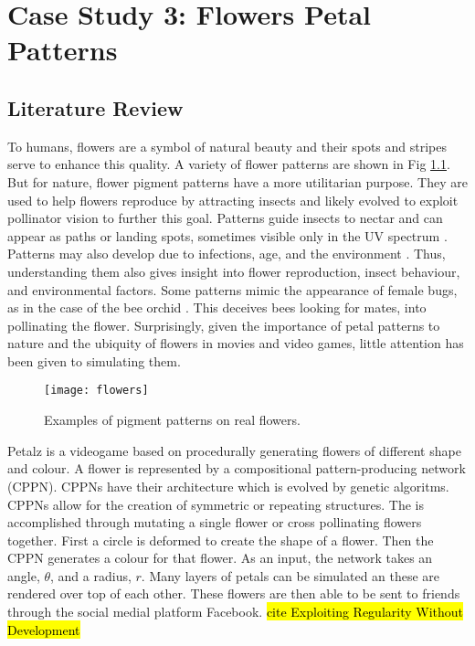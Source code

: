 \chapter{Case Study 3: Flowers Petal Patterns}

\section{Literature Review}
To humans, flowers are a symbol of natural beauty and their spots and stripes serve to enhance this quality. A variety of flower patterns are shown in Fig \ref{fig:realFlowers}. But for nature, flower pigment patterns have a more  utilitarian purpose. They are used to help flowers reproduce by attracting insects and likely evolved to exploit pollinator vision to further this goal. Patterns guide insects to nectar and can appear as paths or landing spots, sometimes visible only in the UV spectrum \cite{Davies2012}. Patterns may also develop due to infections, age, and the environment \cite{Davies2012} \cite{ROBINSON2015}. Thus, understanding them also gives insight into flower reproduction, insect behaviour, and environmental factors. Some patterns mimic the appearance of female bugs, as in the case of the bee orchid \cite{Vereecken7484}. This deceives bees looking for mates, into pollinating the flower. Surprisingly, given the importance of petal patterns to nature and the ubiquity of flowers in movies and video games, little attention has been given to simulating them. 

\begin{figure}[!ht]
	\centering
	\texttt{[image: flowers]}
	\caption{Examples of pigment patterns on real flowers.}
	\label{fig:realFlowers}
\end{figure}

Petalz is a videogame based on procedurally generating flowers of different shape and colour. A flower is represented by a compositional pattern-producing network (CPPN). CPPNs have their architecture which is evolved by genetic algoritms. CPPNs allow for the creation of symmetric or repeating structures. The is accomplished through mutating a single flower or cross pollinating flowers together. First a circle is deformed to create the shape of a flower. Then the CPPN generates a colour for that flower. As an input, the network takes an angle, $\theta$, and a radius, $r$. Many layers of petals can be simulated an these are rendered over top of each other. These flowers are then able to be sent to friends through the social medial platform Facebook. \hl{cite Exploiting Regularity Without Development}


